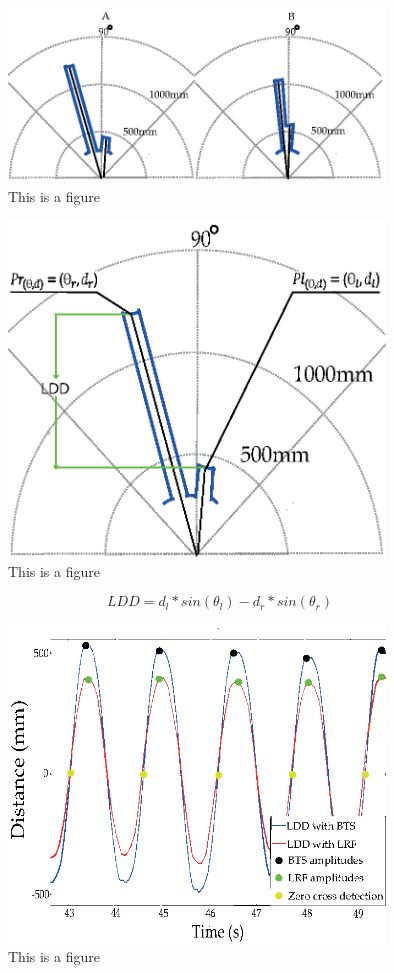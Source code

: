\documentclass[journal,article,submit,moreauthors,pdftex,10pt,a4paper]{mdpi}
\theoremstyle{mdpi}
\newcounter{re}
\theoremstyle{mdpidefinition}
\begin{document}
\begin{figure}[H]
\centering
\includegraphics[width=10cm]{Legs_detection.eps}
\caption{This is a figure}
\end{figure}  

\begin{figure}[H]
\centering
\includegraphics[width=10cm]{LDD_stimation.eps}
\caption{This is a figure}
\end{figure}   

\begin{equation}
LDD = d_{l}*sin(\theta_{l}) - d_{r}*sin(\theta_{r}) 
\end{equation}

\begin{figure}[H]
\centering
\includegraphics[width=10cm]{LDD_maxZero_detection2.eps}
\caption{This is a figure}
\end{figure} 
\end{document}
